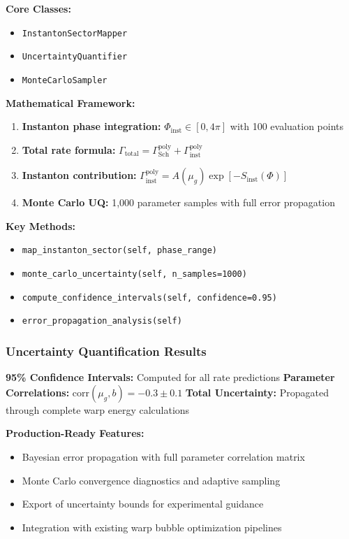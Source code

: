 \documentclass[11pt]{article}
\begin{document}
\textbf{Core Classes:}
\begin{itemize}
    \item \texttt{InstantonSectorMapper}
    \item \texttt{UncertaintyQuantifier}
    \item \texttt{MonteCarloSampler}
\end{itemize}

\textbf{Mathematical Framework:}
\begin{enumerate}
    \item \textbf{Instanton phase integration:} $\Phi_{\text{inst}} \in [0, 4\pi]$ with 100 evaluation points
    \item \textbf{Total rate formula:} $\Gamma_{\text{total}} = \Gamma_{\text{Sch}}^{\text{poly}} + \Gamma_{\text{inst}}^{\text{poly}}$
    \item \textbf{Instanton contribution:} $\Gamma_{\text{inst}}^{\text{poly}} = A(\mu_g) \exp[-S_{\text{inst}}(\Phi)]$
    \item \textbf{Monte Carlo UQ:} 1,000 parameter samples with full error propagation
\end{enumerate}

\textbf{Key Methods:}
\begin{itemize}
    \item \texttt{map\_instanton\_sector(self, phase\_range)}
    \item \texttt{monte\_carlo\_uncertainty(self, n\_samples=1000)}
    \item \texttt{compute\_confidence\_intervals(self, confidence=0.95)}
    \item \texttt{error\_propagation\_analysis(self)}
\end{itemize}

\subsubsection{Uncertainty Quantification Results}
\textbf{95\% Confidence Intervals:} Computed for all rate predictions
\textbf{Parameter Correlations:} $\text{corr}(\mu_g, b) = -0.3 \pm 0.1$
\textbf{Total Uncertainty:} Propagated through complete warp energy calculations

\textbf{Production-Ready Features:}
\begin{itemize}
    \item Bayesian error propagation with full parameter correlation matrix
    \item Monte Carlo convergence diagnostics and adaptive sampling
    \item Export of uncertainty bounds for experimental guidance
    \item Integration with existing warp bubble optimization pipelines
\end{itemize}
\end{document}

